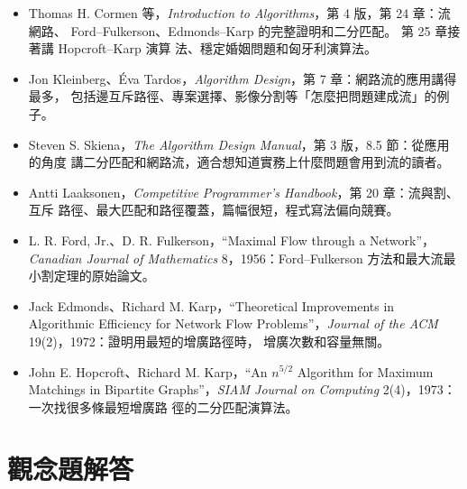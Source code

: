 \begin{itemize}
\item Thomas H. Cormen 等，\textit{Introduction to Algorithms}，第 4 版，第 24 章：流網路、
Ford--Fulkerson、Edmonds--Karp 的完整證明和二分匹配。 第 25 章接著講 Hopcroft--Karp 演算
法、穩定婚姻問題和匈牙利演算法。
\item Jon Kleinberg、Éva Tardos，\textit{Algorithm Design}，第 7 章：網路流的應用講得最多，
包括邊互斥路徑、專案選擇、影像分割等「怎麼把問題建成流」的例子。
\item Steven S. Skiena，\textit{The Algorithm Design Manual}，第 3 版，8.5 節：從應用的角度
講二分匹配和網路流，適合想知道實務上什麼問題會用到流的讀者。
\item Antti Laaksonen，\textit{Competitive Programmer's Handbook}，第 20 章：流與割、互斥
路徑、最大匹配和路徑覆蓋，篇幅很短，程式寫法偏向競賽。
\item L. R. Ford, Jr.、D. R. Fulkerson，``Maximal Flow through a Network''，\textit{Canadian
Journal of Mathematics} 8，1956：Ford--Fulkerson 方法和最大流最小割定理的原始論文。
\item Jack Edmonds、Richard M. Karp，``Theoretical Improvements in Algorithmic Efficiency for
Network Flow Problems''，\textit{Journal of the ACM} 19(2)，1972：證明用最短的增廣路徑時，
增廣次數和容量無關。
\item John E. Hopcroft、Richard M. Karp，``An $n^{5/2}$ Algorithm for Maximum Matchings in
Bipartite Graphs''，\textit{SIAM Journal on Computing} 2(4)，1973：一次找很多條最短增廣路
徑的二分匹配演算法。
\end{itemize}

\section*{觀念題解答}

